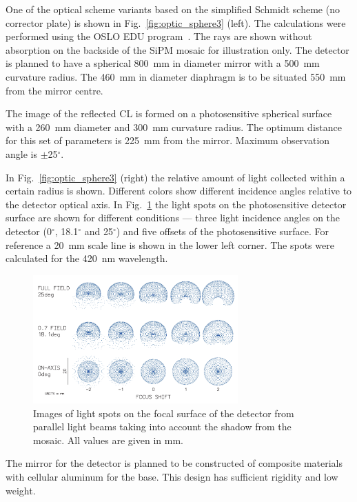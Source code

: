 \documentclass[a4paper,11pt]{article}
\begin{document}
One of the optical scheme variants based on the simplified Schmidt scheme (no corrector plate) is shown in Fig.~\ref{fig:optic_sphere3} (left). The calculations were performed using the OSLO EDU program~\cite{Oslo}. The rays are shown without absorption on the backside of the SiPM mosaic for illustration only. The detector is planned to have a spherical 800~mm in diameter mirror with a 500~mm curvature radius. The 460~mm in diameter diaphragm is to be situated 550~mm from the mirror centre.

The image of the reflected CL is formed on a photosensitive spherical surface with a 260~mm diameter and 300~mm curvature radius. The optimum distance for this set of parameters is 225~mm from the mirror. Maximum observation angle is $\pm$25$^\circ$.

In Fig.~\ref{fig:optic_sphere3} (right) the relative amount of light collected within a certain radius is shown. Different colors show different incidence angles relative to the detector optical axis.
In Fig.~\ref{fig:spots} the light spots on the photosensitive detector surface are shown for different conditions --- three light incidence angles on the detector (0$^\circ$, 18.1$^\circ$ and 25$^\circ$) and five offsets of the photosensitive surface. For reference a 20~mm scale line is shown in the lower left corner. The spots were calculated for the 420~nm wavelength.

\begin{figure}[bt]
\centering
\includegraphics[width=0.7\textwidth]{Sphere3spot.pdf}
\caption{Images of light spots on the focal surface of the detector from parallel light beams taking into account the shadow from the mosaic. All values are given in mm.}
\label{fig:spots}
\end{figure}    

The mirror for the detector is planned to be constructed of composite materials with cellular aluminum for the base. This design has sufficient rigidity and low weight.
\end{document}
